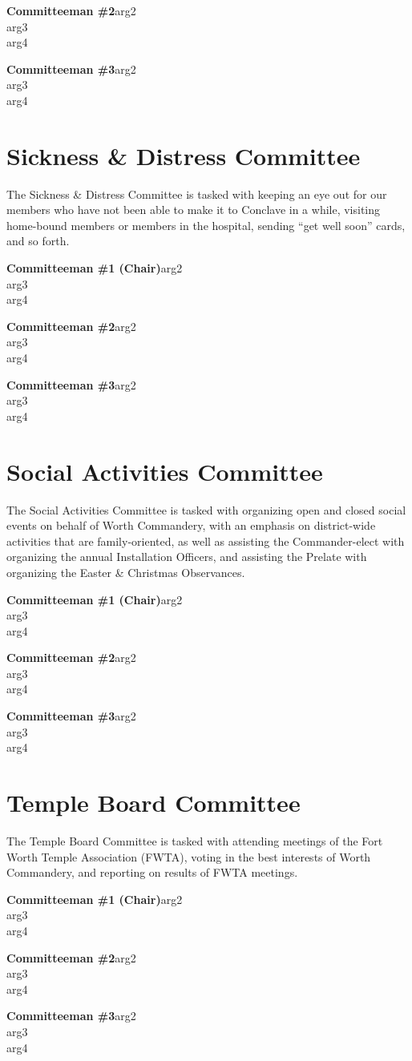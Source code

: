 \documentclass[letterpaper]{article}
\newcommand{\cman}[4]{\textbf{#1}\hspace*{\hfill}#2\\\hspace*{\hfill}#3\\\hspace*{\hfill}#4}
\newcommand{\comm}[3]{\section*{#1 Committee\textsuperscript{#2}}The #1 Committee is tasked with #3}
\newcommand{\bylaw}{\Cross}
\begin{document}
		\cman{Committeeman \#2}{arg2}{arg3}{arg4}
		
		\cman{Committeeman \#3}{arg2}{arg3}{arg4}
	
	\comm{Sickness \& Distress}{\bylaw}{keeping an eye out for our members who have not been able to make it to Conclave in a while, visiting home-bound members or members in the hospital, sending ``get well soon'' cards, and so forth.}
	
		\cman{Committeeman \#1 (Chair)}{arg2}{arg3}{arg4}
		
		\cman{Committeeman \#2}{arg2}{arg3}{arg4}
		
		\cman{Committeeman \#3}{arg2}{arg3}{arg4}
	
	\comm{Social Activities}{}{organizing open and closed social events on behalf of Worth Commandery, with an emphasis on district-wide activities that are family-oriented, as well as assisting the Commander-elect with organizing the annual Installation Officers, and assisting the Prelate with organizing the Easter \& Christmas Observances.}
	
		\cman{Committeeman \#1 (Chair)}{arg2}{arg3}{arg4}
		
		\cman{Committeeman \#2}{arg2}{arg3}{arg4}
		
		\cman{Committeeman \#3}{arg2}{arg3}{arg4}
	
	\comm{Temple Board}{}{attending meetings of the Fort Worth Temple Association (FWTA), voting in the best interests of Worth Commandery, and reporting on results of FWTA meetings.}
	
		\cman{Committeeman \#1 (Chair)}{arg2}{arg3}{arg4}
		
		\cman{Committeeman \#2}{arg2}{arg3}{arg4}
		
		\cman{Committeeman \#3}{arg2}{arg3}{arg4}
\end{document}
